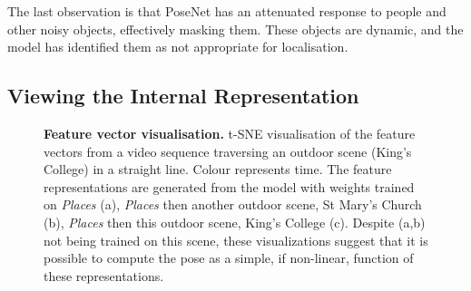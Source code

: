 The last observation is that PoseNet has an attenuated response to people and other noisy objects, effectively masking them. These objects are dynamic, and the model has identified them as not appropriate for localisation.

\subsection{Viewing the Internal Representation}

\begin{figure}[t]
   \caption[Feature vector visualisation.]{\textbf{Feature vector visualisation.} t-SNE visualisation of the feature vectors from a video sequence traversing an outdoor scene (King's College) in a straight line. Colour represents time. The feature representations are generated from the model with weights trained on \textit{Places} (a), \textit{Places} then another outdoor scene, St Mary's Church (b), \textit{Places} then this outdoor scene, King's College (c). Despite (a,b) not being trained on this scene, these visualizations suggest that it is possible to compute the pose as a simple, if non-linear, function of these representations.}
\label{fig:tsne}
\end{figure}

